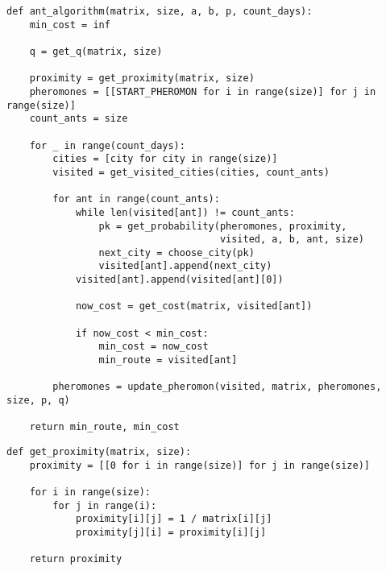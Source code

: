 \begin{center}
\captionsetup{justification=raggedright,singlelinecheck=off}
\begin{lstlisting}[label=lst:ant,caption=Муравьиный алгоритм]
def ant_algorithm(matrix, size, a, b, p, count_days):
    min_cost = inf

    q = get_q(matrix, size)

    proximity = get_proximity(matrix, size)
    pheromones = [[START_PHEROMON for i in range(size)] for j in range(size)]
    count_ants = size

    for _ in range(count_days):
        cities = [city for city in range(size)]
        visited = get_visited_cities(cities, count_ants)

        for ant in range(count_ants):
            while len(visited[ant]) != count_ants:
                pk = get_probability(pheromones, proximity,
                                     visited, a, b, ant, size)
                next_city = choose_city(pk)
                visited[ant].append(next_city)
            visited[ant].append(visited[ant][0])

            now_cost = get_cost(matrix, visited[ant])

            if now_cost < min_cost:
                min_cost = now_cost
                min_route = visited[ant]

        pheromones = update_pheromon(visited, matrix, pheromones, size, p, q)

    return min_route, min_cost

\end{lstlisting}
\end{center}
\clearpage
\begin{center}
\captionsetup{justification=raggedright,singlelinecheck=off}
\begin{lstlisting}[label=lst:proximity,caption=Алгоритм получения матрицы видимостей городов]
def get_proximity(matrix, size):
    proximity = [[0 for i in range(size)] for j in range(size)]

    for i in range(size):
        for j in range(i):
            proximity[i][j] = 1 / matrix[i][j]
            proximity[j][i] = proximity[i][j]
    
    return proximity
\end{lstlisting}
\end{center}

